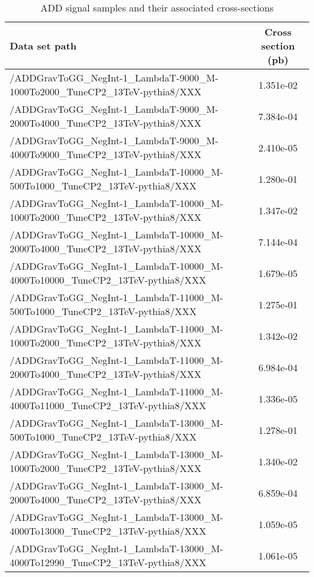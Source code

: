 \begin{landscape}
\begin{table}[!htbp]
       \caption{ ADD signal samples and their associated cross-sections }
       \centering
       \vspace{\baselineskip}
       \begin{tabular}{lc}
       \hline \hline
       Data set path & Cross section (pb)\\
       \hline

       /ADDGravToGG\_NegInt-1\_LambdaT-9000\_M-1000To2000\_TuneCP2\_13TeV-pythia8/XXX &  1.351e-02\\
       /ADDGravToGG\_NegInt-1\_LambdaT-9000\_M-2000To4000\_TuneCP2\_13TeV-pythia8/XXX &  7.384e-04\\
       /ADDGravToGG\_NegInt-1\_LambdaT-9000\_M-4000To9000\_TuneCP2\_13TeV-pythia8/XXX &  2.410e-05\\
       /ADDGravToGG\_NegInt-1\_LambdaT-10000\_M-500To1000\_TuneCP2\_13TeV-pythia8/XXX &  1.280e-01\\
       /ADDGravToGG\_NegInt-1\_LambdaT-10000\_M-1000To2000\_TuneCP2\_13TeV-pythia8/XXX &  1.347e-02\\
       /ADDGravToGG\_NegInt-1\_LambdaT-10000\_M-2000To4000\_TuneCP2\_13TeV-pythia8/XXX &  7.144e-04\\
       /ADDGravToGG\_NegInt-1\_LambdaT-10000\_M-4000To10000\_TuneCP2\_13TeV-pythia8/XXX &  1.679e-05\\
       /ADDGravToGG\_NegInt-1\_LambdaT-11000\_M-500To1000\_TuneCP2\_13TeV-pythia8/XXX &  1.275e-01\\
       /ADDGravToGG\_NegInt-1\_LambdaT-11000\_M-1000To2000\_TuneCP2\_13TeV-pythia8/XXX &  1.342e-02\\
       /ADDGravToGG\_NegInt-1\_LambdaT-11000\_M-2000To4000\_TuneCP2\_13TeV-pythia8/XXX &  6.984e-04\\
       /ADDGravToGG\_NegInt-1\_LambdaT-11000\_M-4000To11000\_TuneCP2\_13TeV-pythia8/XXX &  1.336e-05\\
       /ADDGravToGG\_NegInt-1\_LambdaT-13000\_M-500To1000\_TuneCP2\_13TeV-pythia8/XXX &  1.278e-01\\
       /ADDGravToGG\_NegInt-1\_LambdaT-13000\_M-1000To2000\_TuneCP2\_13TeV-pythia8/XXX & 1.340e-02\\
       /ADDGravToGG\_NegInt-1\_LambdaT-13000\_M-2000To4000\_TuneCP2\_13TeV-pythia8/XXX &  6.859e-04\\
       /ADDGravToGG\_NegInt-1\_LambdaT-13000\_M-4000To13000\_TuneCP2\_13TeV-pythia8/XXX &  1.059e-05\\
       /ADDGravToGG\_NegInt-1\_LambdaT-13000\_M-4000To12990\_TuneCP2\_13TeV-pythia8/XXX &  1.061e-05\\

       \hline \hline
       \end{tabular}
       \label{table:ADD_signal_samples_xsec}
\end{table}
\end{landscape}

